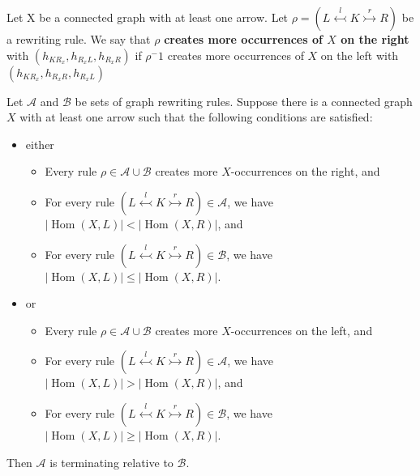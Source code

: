 
\begin{definition}
    \label{def:creates_more_x_on_the_right}
    Let X be a connected graph with at least one arrow. Let $\rho \mathop{=} (L \overset{l}{\leftarrowtail} K \overset{r}{\rightarrowtail} R)$ be a rewriting rule. We say that \( \rho \) \textbf{creates more occurrences of $X$ on the right} with $(h_{KR_x}, h_{R_xL}, h_{R_xR})$ if \( \rho^-1 \) creates more occurrences of $X$ on the left with $(h_{KR_x}, h_{R_xR}, h_{R_xL})$
\end{definition}

\begin{theorem}
  \label{thm:termination_gls_complex_graph}
  Let \(\mathcal{A}\) and \(\mathcal{B}\) be sets of graph rewriting rules. Suppose there is a connected graph \(X\) with at least one arrow such that the following conditions are satisfied:
  \begin{itemize}
    \item either
      \begin{itemize}
          \item Every rule \(\rho \mathop{\in} \mathcal{A} \mathop{\cup} \mathcal{B}\) creates more \(X\)-occurrences on the right, and
          \item For every rule \(\left( L \overset{l}{\leftarrowtail} K \overset{r}{\rightarrowtail} R \right) \mathop{\in} \mathcal{A}\), we have \(|\operatorname{Hom}(X,L)| < |\operatorname{Hom}(X,R)|\), and
          \item For every rule \(\left( L \overset{l}{\leftarrowtail} K \overset{r}{\rightarrowtail} R \right) \mathop{\in} \mathcal{B}\), we have \(|\operatorname{Hom}(X,L)| \leq |\operatorname{Hom}(X,R)|\).
      \end{itemize}
    \item or 
    \begin{itemize}
      \item Every rule \(\rho \mathop{\in} \mathcal{A} \mathop{\cup} \mathcal{B}\) creates more \(X\)-occurrences on the left, and
      \item For every rule \(\left( L \overset{l}{\leftarrowtail} K \overset{r}{\rightarrowtail} R \right) \mathop{\in} \mathcal{A}\), we have \(|\operatorname{Hom}(X,L)| \mathop{>} |\operatorname{Hom}(X,R)|\), and
      \item For every rule \(\left( L \overset{l}{\leftarrowtail} K \overset{r}{\rightarrowtail} R \right) \mathop{\in} \mathcal{B}\), we have \(|\operatorname{Hom}(X,L)| \mathop{\geq} |\operatorname{Hom}(X,R)|\).
  \end{itemize}
\end{itemize}
  Then \(\mathcal{A}\) is terminating relative to \(\mathcal{B}\).
\end{theorem}

